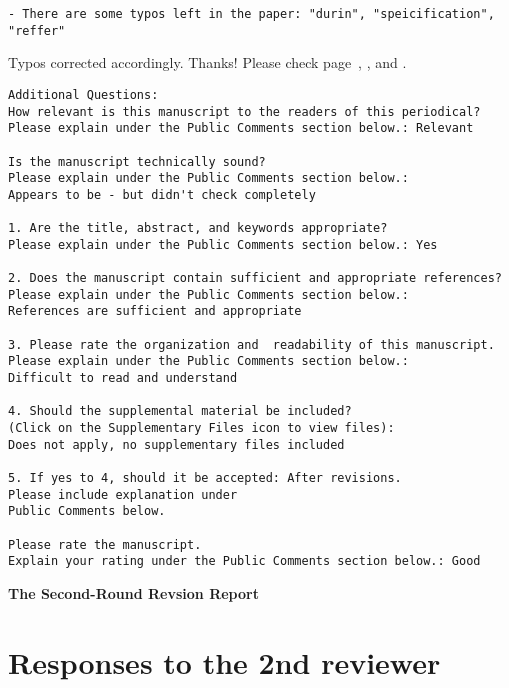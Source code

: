 \documentclass[times,10pt,twocolumn]{article}
\newcounter{cabbage0}
\newcounter{cabbage1}
\newcounter{cabbage2}
\newcounter{cabbage3}
\newcounter{bean0}
\newcounter{bean1}
\newcounter{bean2}
\newcounter{bean3}
\newcounter{bean4}
\newcounter{bean5}
\newcounter{bean6}
\newenvironment{reply1}{\begin{list}{\bf (Reply 1.\arabic{bean1}):} 
        {\usecounter{bean1}\setcounter{bean1}{\value{cabbage1}} \item \setcounter{cabbage1}{\value{bean1}} 
        }
}{\end{list}}
\begin{document}
\begin{verbatim} 
- There are some typos left in the paper: "durin", "speicification", "reffer"
\end{verbatim}
\begin{reply1} 
Typos corrected accordingly. 
Thanks!
Please check page~\pageref{reply1.durin1}, 
\pageref{reply1.speicification}, and 
\pageref{reply1.reffer}. 
\end{reply1} 
\begin{verbatim} 
Additional Questions:
How relevant is this manuscript to the readers of this periodical? 
Please explain under the Public Comments section below.: Relevant

Is the manuscript technically sound? 
Please explain under the Public Comments section below.: 
Appears to be - but didn't check completely

1. Are the title, abstract, and keywords appropriate? 
Please explain under the Public Comments section below.: Yes

2. Does the manuscript contain sufficient and appropriate references? 
Please explain under the Public Comments section below.: 
References are sufficient and appropriate

3. Please rate the organization and  readability of this manuscript. 
Please explain under the Public Comments section below.: 
Difficult to read and understand

4. Should the supplemental material be included? 
(Click on the Supplementary Files icon to view files): 
Does not apply, no supplementary files included

5. If yes to 4, should it be accepted: After revisions.  
Please include explanation under 
Public Comments below.

Please rate the manuscript. 
Explain your rating under the Public Comments section below.: Good

\end{verbatim} 






\newpage 
\begin{center} 
\bf\LARGE The Second-Round Revsion Report 
\end{center} 
\section{Responses to the 2nd reviewer} 
\end{document}
